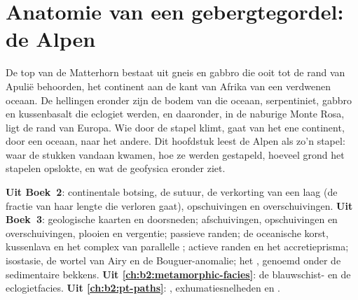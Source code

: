 \chapter{Anatomie van een gebergtegordel: de Alpen}\label{ch:b2:alpine-orogen}

De top van de Matterhorn bestaat uit gneis en gabbro die ooit tot de rand van
Apulië behoorden, het continent aan de kant van Afrika van een verdwenen oceaan. De hellingen eronder
zijn de bodem van die oceaan, serpentiniet, gabbro en kussenbasalt die eclogiet werden, en
daaronder, in de naburige Monte Rosa, ligt de rand van Europa. Wie door de
stapel klimt, gaat van het ene continent, door een oceaan, naar het andere. Dit hoofdstuk leest de Alpen als zo'n stapel: waar de stukken vandaan kwamen, hoe ze
werden gestapeld, hoeveel grond het stapelen opslokte, en wat de geofysica eronder ziet.

\begin{recall}
\textbf{Uit Boek~2}: continentale botsing, de sutuur, de verkorting van een
laag (de fractie van haar lengte die verloren gaat), opschuivingen en overschuivingen. \textbf{Uit
Boek~3}: geologische kaarten en doorsneden; afschuivingen, opschuivingen en overschuivingen, plooien en
vergentie; passieve randen; de oceanische korst, kussenlava en het complex van parallelle ;
actieve randen en het accretieprisma; isostasie, de wortel van Airy en de Bouguer-anomalie;
het , genoemd onder de sedimentaire bekkens. \textbf{Uit
\cref{ch:b2:metamorphic-facies}}: de blauwschist- en de eclogietfacies. \textbf{Uit
\cref{ch:b2:pt-paths}}: , exhumatiesnelheden en
.
\end{recall}

